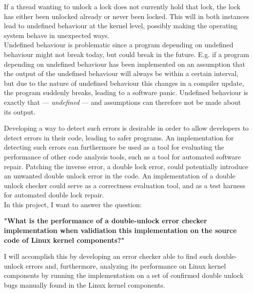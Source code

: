 \noindent If a thread wanting to unlock a lock does not currently hold that lock, the lock has either been unlocked already or never been locked. This will in both instances lead to undefined behaviour at the kernel level, possibly making the operating system behave in unexpected ways. \\

\noindent Undefined behaviour is problematic since a program depending on undefined behaviour might not break today, but could break in the future. E.g. if a program depending on undefined behaviour has been implemented on an assumption that the output of the undefined behaviour will always be within a certain interval, but due to the nature of undefined behaviour this changes in a compiler update, the program suddenly breaks, leading to a software panic. Undefined behaviour is exactly that --- \textit{undefined} --- and assumptions can therefore not be made about its output. \\

\noindent Developing a way to detect such errors is desirable in order to allow developers to detect errors in their code, leading to safer programs. An implementation for detecting such errors can furthermore be used as a tool for evaluating the performance of other code analysis tools, such as a tool for automated software repair. Patching the inverse error, a double lock error, could potentially introduce an unwanted double unlock error in the code. An implementation of a double unlock checker could serve as a correctness evaluation tool, and as a test harness for automated double lock repair. \\

\noindent In this project, I want to answer the question:

\begin{center}
    \textbf{"What is the performance of a double-unlock error checker implementation when validiation this implementation on the source code of Linux kernel components?"} 
\end{center}

\noindent I will accomplish this by developing an error checker able to find such double-unlock errors and, furthermore, analyzing its performance on Linux kernel components by running the implementation on a set of confirmed double unlock bugs manually found in the Linux kernel components. 


